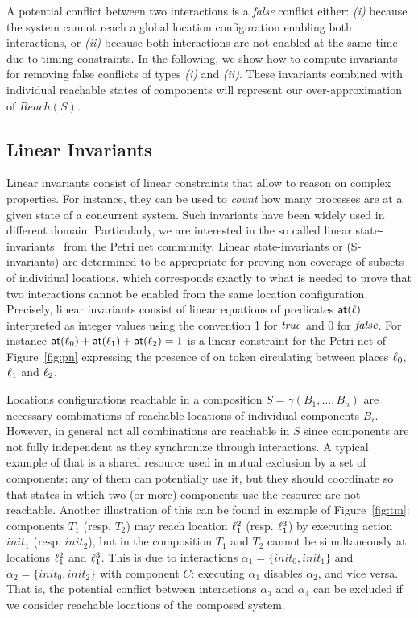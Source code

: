 A potential conflict between two interactions is a \emph{false} conflict either: \emph{(i)} 
because the system cannot reach a global location configuration enabling both interactions, 
or \emph{(ii)} because both interactions are not enabled at the same time due to timing 
constraints.
In the following, we show how to compute invariants for removing false conflicts of
types \emph{(i)} and \emph{(ii)}. These invariants combined with
individual reachable states of components will represent our over-approximation of $Reach(S)$.
\subsection{Linear Invariants}

Linear invariants consist of linear constraints that allow to reason on complex properties.
For instance, they can be used to \emph{count} how many processes are at a given state
of a concurrent system. Such invariants have been widely used in different domain.
Particularly, we are interested in the so called linear state-invariants~\cite{petri,inv1,inv2} 
from the 
Petri net community. Linear state-invariants or (S-invariants) are determined to be 
appropriate for proving non-coverage of subsets of individual locations, 
which corresponds exactly to what is needed to prove that two interactions 
cannot be enabled from the same location configuration.
Precisely, linear invariants consist of linear equations of predicates $\textsf{at}(\ell)$ interpreted
as integer values using the convention 1 for $\textnormal{\textit{true}}$ and 0 for $\textnormal{\textit{false}}$.
For instance $\textsf{at}(\ell_0)+\textsf{at}(\ell_1)+\textsf{at}(\ell_2)=1$ is a linear constraint
for the Petri net of Figure~\ref{fig:pn} expressing the presence of on token circulating
between places $\ell_0$, $\ell_1$ and $\ell_2$.

Locations configurations reachable in a composition 
$S = \gamma(B_1,\dotsc,B_n)$ are necessary combinations 
of reachable locations of individual components $B_i$.
However, in general not all combinations are reachable in $S$ since components are not 
fully independent as they synchronize through interactions.
A typical example of that is a shared resource used in mutual exclusion by a set of 
components: any of them can potentially use it, but they should coordinate so that states in 
which two (or more) components use the resource are not reachable.
Another illustration of this can be found in example of Figure~\ref{fig:tm}: components 
$T_1$ (resp. $T_2$) may reach location $\ell_1^2$ (resp. $\ell_1^3$) by executing 
action $init_1$ (resp. $init_2$), but in the composition $T_1$ and $T_2$ cannot be 
simultaneously at locations $\ell_1^2$ and $\ell_1^3$.
This is due to interactions $\alpha_1 = \{ init_0, init_1 \}$ and 
$\alpha_2 = \{ init_0, init_2 \}$ with component $C$: executing $\alpha_1$ disables 
$\alpha_2$, and vice versa.
That is, the potential conflict between interactions $\alpha_3$ and $\alpha_4$ can be 
excluded if we consider reachable locations of the composed system.

